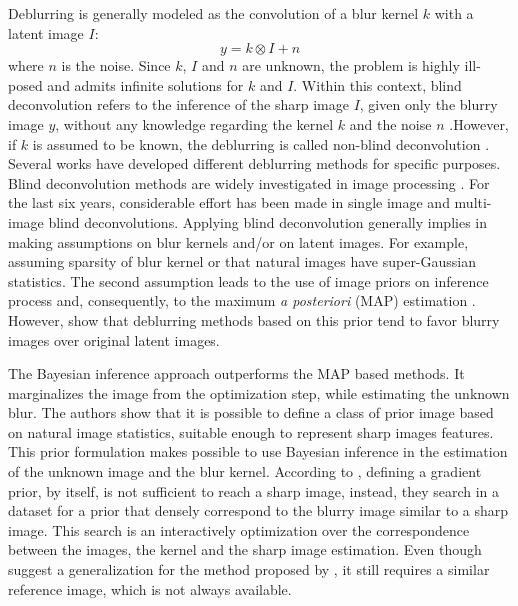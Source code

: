 \documentclass[conference]{IEEEtran}
\begin{document}
Deblurring is generally modeled as the convolution of a blur kernel $k$
with a latent image $I$: 
\begin{equation}
 y = k \otimes I + n
 \label{eq:deblurr}
\end{equation}
where $n$ is the noise. Since $k$, $I$ and $n$ are unknown, the problem 
is highly ill-posed and admits infinite solutions for $k$ and $I$.
Within this context, blind deconvolution refers to the inference of the
sharp image $I$, given only the blurry image $y$, without any knowledge
regarding the kernel $k$ and the noise $n$ \cite{Zhang2013}.However, if $k$ is assumed to be known,
the deblurring is called non-blind deconvolution \cite{Wang2009}. 
Several works have developed different deblurring methods for specific purposes.
Blind deconvolution methods are widely investigated in image processing \cite{Bishop2007}.
For the last six years, considerable effort has been made in single image
\cite{Babacan2012,Krishnan2015,Levin2011,Zhang2011} and multi-image \cite{sroubek2012,Zhu2012} blind deconvolutions. 
Applying blind deconvolution generally implies in making assumptions on
blur kernels and/or on latent images. For example, assuming sparsity of blur kernel
or that natural images have super-Gaussian statistics. The second assumption
leads to the use of image priors on inference process and, consequently, to the maximum \textit{a posteriori}
(MAP) estimation \cite{Babacan2012}. However, \cite{Levin} show that deblurring methods
based on this prior tend to favor blurry images over original latent images.

The Bayesian inference approach \cite{Levin} outperforms the MAP based methods. It marginalizes
the image from the optimization step, while estimating the unknown blur.
The authors show that it is possible to define a class of prior image
based on natural image statistics, suitable enough to represent sharp images features.
This prior formulation makes possible to use Bayesian inference in the estimation of the
unknown image and the blur kernel. According to \cite{Hacohen13}, defining a gradient
prior, by itself, is not sufficient to reach a sharp image, instead,
they search in a dataset for a prior that densely correspond to
the blurry image similar to a sharp image. This search is an
interactively optimization over the correspondence between the images, the kernel and
the sharp image estimation. Even though \cite{Pan2014} suggest a generalization
for the method proposed by \cite{Hacohen13}, it still requires a similar reference image,
which is not always available.
\end{document}
